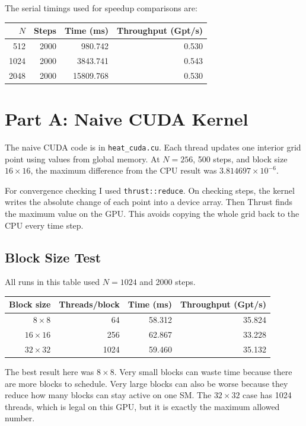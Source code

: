 \documentclass[11pt]{article}
\begin{document}
The serial timings used for speedup comparisons are:

\begin{center}
\begin{tabular}{rrrr}
\toprule
\(N\) & Steps & Time (ms) & Throughput (Gpt/s) \\
\midrule
512 & 2000 & 980.742 & 0.530 \\
1024 & 2000 & 3843.741 & 0.543 \\
2048 & 2000 & 15809.768 & 0.530 \\
\bottomrule
\end{tabular}
\end{center}

\section{Part A: Naive CUDA Kernel}

The naive CUDA code is in \texttt{heat\_cuda.cu}. Each thread updates one
interior grid point using values from global memory. At \(N=256\), 500 steps,
and block size \(16\times16\), the maximum difference from the CPU result was
\(3.814697\times10^{-6}\).

For convergence checking I used \texttt{thrust::reduce}. On checking steps, the
kernel writes the absolute change of each point into a device array. Then Thrust
finds the maximum value on the GPU. This avoids copying the whole grid back to
the CPU every time step.

\subsection{Block Size Test}

All runs in this table used \(N=1024\) and 2000 steps.

\begin{center}
\begin{tabular}{rrrr}
\toprule
Block size & Threads/block & Time (ms) & Throughput (Gpt/s) \\
\midrule
\(8\times8\) & 64 & 58.312 & 35.824 \\
\(16\times16\) & 256 & 62.867 & 33.228 \\
\(32\times32\) & 1024 & 59.460 & 35.132 \\
\bottomrule
\end{tabular}
\end{center}

The best result here was \(8\times8\). Very small blocks can waste time because
there are more blocks to schedule. Very large blocks can also be worse because
they reduce how many blocks can stay active on one SM. The \(32\times32\) case
has 1024 threads, which is legal on this GPU, but it is exactly the maximum
allowed number.
\end{document}
